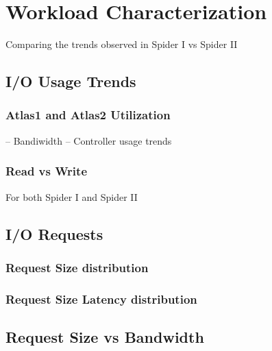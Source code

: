 \section{Workload Characterization}
\label{sec:workloadchar}

Comparing the trends observed in Spider I vs Spider II

\subsection{I/O Usage Trends}
\subsubsection{Atlas1 and Atlas2 Utilization}
-- Bandiwidth
-- Controller usage trends

\subsubsection{Read vs Write}
For both Spider I and Spider II

\subsection{I/O Requests}
\subsubsection{Request Size distribution}
\subsubsection{Request Size Latency distribution}

\subsection{Request Size vs Bandwidth}

 
